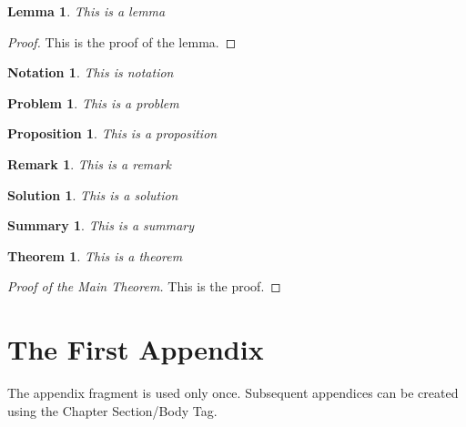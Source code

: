 \documentclass{amsbook}
\theoremstyle{plain}
\newtheorem{lemma}{Lemma}
\newtheorem{notation}{Notation}
\newtheorem{problem}{Problem}
\newtheorem{proposition}{Proposition}
\newtheorem{remark}{Remark}
\newtheorem{solution}{Solution}
\newtheorem{summary}{Summary}
\newtheorem{theorem}{Theorem}
\numberwithin{equation}{chapter}
\begin{document}
\begin{lemma}
This is a lemma
\end{lemma}

\begin{proof}
This is the proof of the lemma.
\end{proof}

\begin{notation}
This is notation
\end{notation}

\begin{problem}
This is a problem
\end{problem}

\begin{proposition}
This is a proposition
\end{proposition}

\begin{remark}
This is a remark
\end{remark}

\begin{solution}
This is a solution
\end{solution}

\begin{summary}
This is a summary
\end{summary}

\begin{theorem}
This is a theorem
\end{theorem}

\begin{proof}[Proof of the Main Theorem]
This is the proof.
\end{proof}

\backmatter\appendix

\chapter{The First Appendix}

The appendix fragment is used only once. Subsequent appendices can be
created using the Chapter Section/Body Tag.
\end{document}
